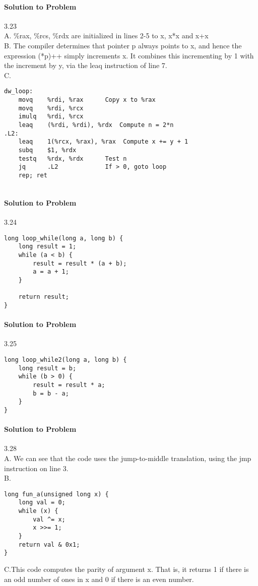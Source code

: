 \documentclass{report}
\begin{document}
\paragraph{Solution to Problem } 3.23 \\
A. \%rax, \%rcs, \%rdx are initialized in lines 2-5 to x, x*x and x+x \\
B. The compiler determines that pointer p always points to x, and hence the expression (*p)++ simply increments x. It combines this incrementing by 1 with the increment by y, via the leaq instruction of line 7. \\
C. 
\begin{lstlisting}
dw_loop:
    movq    %rdi, %rax      Copy x to %rax
    movq    %rdi, %rcx
    imulq   %rdi, %rcx
    leaq    (%rdi, %rdi), %rdx  Compute n = 2*n
.L2:
    leaq    1(%rcx, %rax), %rax  Compute x += y + 1
    subq    $1, %rdx
    testq   %rdx, %rdx      Test n
    jq      .L2             If > 0, goto loop
    rep; ret
    
\end{lstlisting}

\paragraph{Solution to Problem } 3.24 \\
\begin{lstlisting}
long loop_while(long a, long b) {
    long result = 1;
    while (a < b) {
        result = result * (a + b);
        a = a + 1;
    }
    
    return result;
}
\end{lstlisting}

\paragraph{Solution to Problem } 3.25 \\
\begin{lstlisting}
long loop_while2(long a, long b) {
    long result = b;
    while (b > 0) {
        result = result * a;
        b = b - a;
    }
}
\end{lstlisting}

\paragraph{Solution to Problem } 3.28 \\
A. We can see that the code uses the jump-to-middle translation, using the jmp instruction on line 3. \\
B.
\begin{lstlisting}
long fun_a(unsigned long x) {
    long val = 0;
    while (x) {
        val ^= x;
        x >>= 1;
    }
    return val & 0x1;
}
\end{lstlisting}
C.This code computes the parity of argument x. That is, it returns 1 if there is an odd number of ones in x and 0 if there is an even number.
\end{document}
